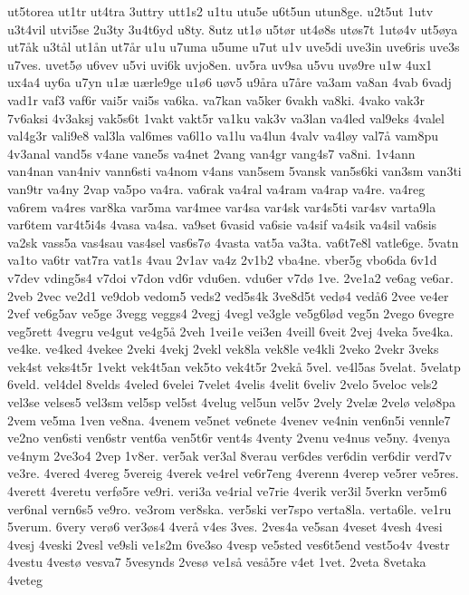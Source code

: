 {ut5torea
ut1tr
ut4tra
3uttry
utt1s2
u1tu
utu5e
u6t5un
utun8ge.
u2t5ut
1utv
u3t4vil
utvi5se
2u3ty
3u4t6yd
u8ty.
8utz
ut1^^f8
u5t^^f8r
ut4^^f88s
ut^^f8s7t
1ut^^f84v
ut5^^f8ya
ut7^^e5k
u3t^^e5l
ut1^^e5n
ut7^^e5r
u1u
u7uma
u5ume
u7ut
u1v
uve5di
uve3in
uve6ris
uve3s
u7ves.
uvet5^^f8
u6vev
u5vi
uvi6k
uvjo8en.
uv5ra
uv9sa
u5vu
uv^^f89re
u1w
4ux1
ux4a4
uy6a
u7yn
u1^^e6
u^^e6rle9ge
u1^^f86
u^^f8v5
u9^^e5ra
u7^^e5re
va3am
va8an
4vab
6vadj
vad1r
vaf3
vaf6r
vai5r
vai5s
va6ka.
va7kan
va5ker
6vakh
va8ki.
4vako
vak3r
7v6aksi
4v3aksj
vak5s6t
1vakt
vakt5r
va1ku
vak3v
va3lan
va4led
val9eks
4valel
val4g3r
vali9e8
val3la
val6mes
va6l1o
va1lu
va4lun
4valv
va4l^^f8y
val7^^e5
vam8pu
4v3anal
vand5s
v4ane
vane5s
va4net
2vang
van4gr
vang4s7
va8ni.
1v4ann
van4nan
van4niv
vann6sti
va4nom
v4ans
van5sem
5vansk
van5s6ki
van3sm
van3ti
van9tr
va4ny
2vap
va5po
va4ra.
va6rak
va4ral
va4ram
va4rap
va4re.
va4reg
va6rem
va4res
var8ka
var5ma
var4mee
var4sa
var4sk
var4s5ti
var4sv
varta9la
var6tem
var4t5i4s
4vasa
va4sa.
va9set
6vasid
va6sie
va4sif
va4sik
va4sil
va6sis
va2sk
vass5a
vas4sau
vas4sel
vas6s7^^f8
4vasta
vat5a
va3ta.
va6t7e8l
vatle6ge.
5vatn
va1to
va6tr
vat7ra
vat1s
4vau
2v1av
va4z
2v1b2
vba4ne.
vber5g
vbo6da
6v1d
v7dev
vding5s4
v7doi
v7don
vd6r
vdu6en.
vdu6er
v7d^^f8
1ve.
2ve1a2
ve6ag
ve6ar.
2veb
2vec
ve2d1
ve9dob
vedom5
veds2
ved5s4k
3ve8d5t
ved^^f84
ved^^e56
2vee
ve4er
2vef
ve6g5av
ve5ge
3vegg
veggs4
2vegj
4vegl
ve3gle
ve5g6l^^f8d
veg5n
2vego
6vegre
veg5rett
4vegru
ve4gut
ve4g5^^e5
2veh
1vei1e
vei3en
4veill
6veit
2vej
4veka
5ve4ka.
ve4ke.
ve4ked
4vekee
2veki
4vekj
2vekl
vek8la
vek8le
ve4kli
2veko
2vekr
3veks
vek4st
veks4t5r
1vekt
vek4t5an
vek5to
vek4t5r
2vek^^e5
5vel.
ve4l5as
5velat.
5velatp
6veld.
vel4del
8velds
4veled
6velei
7velet
4velis
4velit
6veliv
2velo
5veloc
vels2
vel3se
velses5
vel3sm
vel5sp
vel5st
4velug
vel5un
vel5v
2vely
2vel^^e6
2vel^^f8
vel^^f88pa
2vem
ve5ma
1ven
ve8na.
4venem
ve5net
ve6nete
4venev
ve4nin
ven6n5i
vennle7
ve2no
ven6sti
ven6str
vent6a
ven5t6r
vent4s
4venty
2venu
ve4nus
ve5ny.
4venya
ve4nym
2ve3o4
2vep
1v8er.
ver5ak
ver3al
8verau
ver6des
ver6din
ver6dir
verd7v
ve3re.
4vered
4vereg
5vereig
4verek
ve4rel
ve6r7eng
4verenn
4verep
ve5rer
ve5res.
4verett
4veretu
verf^^f85re
ve9ri.
veri3a
ve4rial
ve7rie
4verik
ver3il
5verkn
ver5m6
ver6nal
vern6s5
ve9ro.
ve3rom
ver8ska.
ver5ski
ver7spo
verta8la.
verta6le.
ve1ru
5verum.
6very
ver^^f86
ver3^^f8s4
4ver^^e5
v4es
3ves.
2ves4a
ve5san
4veset
4vesh
4vesi
4vesj
4veski
2vesl
ve9sli
ve1s2m
6ve3so
4vesp
ve5sted
ves6t5end
vest5o4v
4vestr
4vestu
4vest^^f8
vesva7
5vesynds
2ves^^f8
ve1s^^e5
ves^^e55re
v4et
1vet.
2veta
8vetaka
4veteg
}
